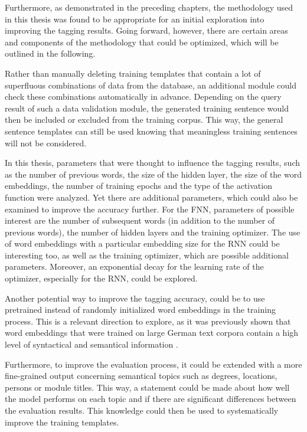 Furthermore, as demonstrated in the preceding chapters, the methodology used in this thesis was found to be appropriate for an initial exploration into improving the tagging results. Going forward, however, there are certain areas and components of the methodology that could be optimized, which will be outlined in the following.

Rather than manually deleting training templates that contain a lot of superfluous combinations of data from the database, an additional module could check these combinations automatically in advance. Depending on the query result of such a data validation module, the generated training sentence would then be included or excluded from the training corpus. This way, the general sentence templates can still be used knowing that meaningless training sentences will not be considered.

In this thesis, parameters that were thought to influence the tagging results, such as the number of previous words, the size of the hidden layer, the size of the word embeddings, the number of training epochs and the type of the activation function were analyzed. Yet there are additional parameters, which could also be examined to improve the accuracy further. For the FNN, parameters of possible interest are the number of subsequent words (in addition to the number of previous words), the number of hidden layers and the training optimizer. The use of word embeddings with a particular embedding size for the RNN could be interesting too, as well as the training optimizer, which are possible additional parameters. Moreover, an exponential decay for the learning rate of the optimizer, especially for the RNN, could be explored.

Another potential way to improve the tagging accuracy, could be to use pretrained instead of randomly initialized word embeddings in the training process. This is a relevant direction to explore, as it was previously shown that word embeddings that were trained on large German text corpora contain a high level of syntactical and semantical information \cite{mueller2015}.

Furthermore, to improve the evaluation process, it could be extended with a more fine-grained output concerning semantical topics such as degrees, locations, persons or module titles. This way, a statement could be made about how well the model performs on each topic and if there are significant differences between the evaluation results. This knowledge could then be used to systematically improve the training templates.

